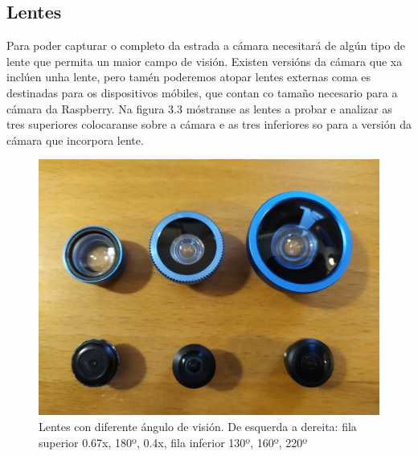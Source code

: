 \subsection{Lentes}
Para poder capturar o completo da estrada a cámara necesitará de algún tipo de lente que permita un maior campo de visión. Existen versións da cámara que xa inclúen unha lente, pero tamén poderemos atopar lentes externas coma es destinadas para os dispositivos móbiles, que contan co tamaño necesario para a cámara da Raspberry. Na figura 3.3 móstranse as lentes a probar e analizar as tres superiores colocaranse sobre a cámara e as tres inferiores so para a versión da cámara que incorpora lente.
\begin{figure}[tb]
  \centering
  \includegraphics[scale=.1]{imaxes/lentes.jpg}
  \caption{Lentes con diferente ángulo de visión. De esquerda a dereita: fila superior 0.67x, 180º, 0.4x, fila inferior 130º, 160º, 220º }
  \label{f:Lentes}
\end{figure}

